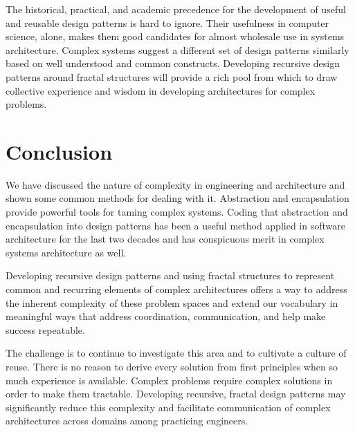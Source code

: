 \documentclass[jou,apacite]{apa6}
\begin{document}
The historical, practical, and academic precedence for the development of useful and reusable design patterns is hard to ignore.  Their usefulness in computer science, alone, makes them good candidates for almost wholesale use in systems architecture.  Complex systems suggest a different set of design patterns similarly based on well understood and common constructs.  Developing recursive design patterns around fractal structures will provide a rich pool from which to draw collective
experience and wisdom in developing architectures for complex problems.

\section{Conclusion}  %
We have discussed the nature of complexity in engineering and architecture and shown some common methods for dealing with it.  Abstraction and encapsulation provide powerful tools for taming complex systems.  Coding that abstraction and encapsulation into design patterns has been a useful method applied in software architecture for the last two decades and has conspicuous merit in complex systems architecture as well.

Developing recursive design patterns and using fractal structures to represent common and recurring elements of complex architectures offers a way to address the inherent complexity of these problem spaces and extend our vocabulary in meaningful ways that address coordination, communication, and help make success repeatable.

The challenge is to continue to investigate this area and to cultivate a culture of reuse.  There is no reason to derive every solution from first principles when so much experience is available.  Complex problems require complex solutions in order to make them tractable.  Developing recursive, fractal design patterns may significantly reduce this complexity and facilitate communication of complex architectures across domains among practicing engineers.


\end{document}
